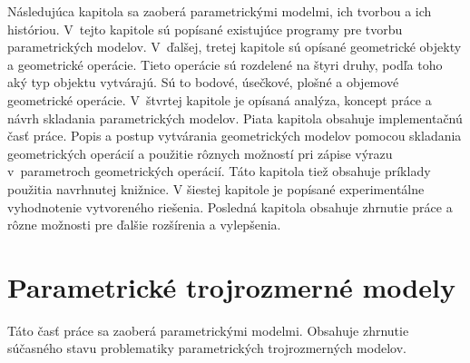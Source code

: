 

Následujúca kapitola sa zaoberá parametrickými modelmi, ich tvorbou a ich históriou.
V~tejto kapitole sú popísané existujúce programy pre tvorbu parametrických modelov.
V~ďalšej, tretej kapitole sú opísané geometrické objekty a geometrické operácie. Tieto operácie sú rozdelené na štyri druhy, podľa toho aký typ objektu vytvárajú. Sú to bodové, úsečkové, plošné a objemové geometrické operácie. 
V~štvrtej kapitole je opísaná analýza, koncept práce a návrh skladania parametrických modelov.
Piata kapitola obsahuje implementačnú časť práce. Popis a postup vytvárania geometrických modelov pomocou skladania geometrických operácií a použitie rôznych možností pri zápise výrazu v~parametroch geometrických operácií. Táto kapitola tiež obsahuje príklady použitia navrhnutej knižnice.
V šiestej kapitole je popísané experimentálne vyhodnotenie vytvoreného riešenia.
Posledná kapitola obsahuje zhrnutie práce a rôzne možnosti pre ďalšie rozšírenia a vylepšenia.

\chapter{Parametrické trojrozmerné modely}
Táto časť práce sa zaoberá parametrickými modelmi. Obsahuje zhrnutie súčasného stavu problematiky parametrických trojrozmerných modelov.

